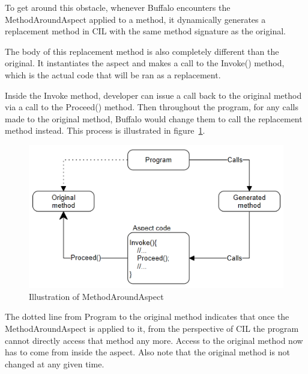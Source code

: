 To get around this obstacle, whenever Buffalo encounters the MethodAroundAspect applied to a method, it dynamically generates a replacement method in CIL with the same method signature as the original.

The body of this replacement method is also completely different than the original. It instantiates the aspect and makes a call to the Invoke() method, which is the actual code that will be ran as a replacement. 

Inside the Invoke method, developer can issue a call back to the original method via a call to the Proceed() method. Then throughout the program, for any calls made to the original method, Buffalo would change them to call the replacement method instead. This process is illustrated in figure~\ref{around_overview}.

\begin{figure}[H]
  \includegraphics[scale=1.0]{AroundOverview3.PNG}
  \centering
  \caption{Illustration of MethodAroundAspect\label{around_overview}}
\end{figure}

The dotted line from Program to the original method indicates that once the MethodAroundAspect is applied to it, from the perspective of CIL the program cannot directly access that method any more. Access to the original method now has to come from inside the aspect. Also note that the original method is not changed at any given time.
